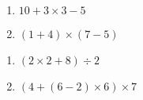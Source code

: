 \documentclass{/home/nyaucki/Documents/Prof/CoursMaths/mycls/DevoirMaison}
\begin{document}
\begin{multicols}{2}
	\begin{enumerate}[label=\alph*.]
		\item $10 + 3 \times 3 - 5$  \vspace*{7em}
		\item $(1 +4)\times (7 -5)$ \vspace*{7em}
	\end{enumerate}
\end{multicols}

\begin{multicols}{2}
	\begin{enumerate}[start=3,label=\alph*.]
		\item $(2 \times 2 +8 ) \div 2$  \vspace*{8em}
		\item $(4 + (6 -2)\times 6)\times 7$ \vspace*{8em}
	\end{enumerate}
\end{multicols}



\newpage
\end{document}
